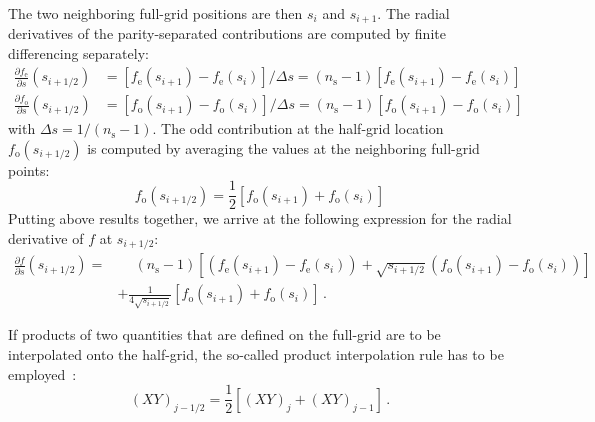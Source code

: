 The two neighboring full-grid positions are then $s_i$ and $s_{i+1}$.
The radial derivatives of the parity-separated contributions are computed by finite differencing separately:
\begin{align}
 \frac{\partial f_\mathrm{e}}{\partial s} \left( s_{i+1/2} \right)
   &= \left[ f_\mathrm{e}(s_{i+1}) - f_\mathrm{e}(s_i) \right] / \Delta s
    = \left( n_\mathrm{s} - 1 \right) \left[ f_\mathrm{e}(s_{i+1}) - f_\mathrm{e}(s_i) \right] \\
 \frac{\partial f_\mathrm{o}}{\partial s} \left( s_{i+1/2} \right)
   &= \left[ f_\mathrm{o}(s_{i+1}) - f_\mathrm{o}(s_i) \right] / \Delta s
    = \left( n_\mathrm{s} - 1 \right) \left[ f_\mathrm{o}(s_{i+1}) - f_\mathrm{o}(s_i) \right]
\end{align}
with $\Delta s = 1 / \left( n_\mathrm{s} - 1 \right)$.
The odd contribution at the half-grid location $f_\mathrm{o}\left( s_{i+1/2} \right)$ is computed
by averaging the values at the neighboring full-grid points:
\begin{equation}
 f_\mathrm{o}\left( s_{i+1/2} \right) = \frac{1}{2} \left[ f_\mathrm{o}(s_{i+1}) + f_\mathrm{o}(s_i) \right]
\end{equation}
Putting above results together, we arrive at the following expression for the radial derivative of $f$ at $s_{i+1/2}$:
\begin{align}
   \frac{\partial f}{\partial s} \left( s_{i+1/2} \right)
 =& \phantom{+}
   \left( n_\mathrm{s} - 1 \right)
   \left[                    \left( f_\mathrm{e}(s_{i+1}) - f_\mathrm{e}(s_i) \right)
          + \sqrt{s_{i+1/2}} \left( f_\mathrm{o}(s_{i+1}) - f_\mathrm{o}(s_i) \right) \right] \nonumber \\
 ~& + \frac{1}{4 \sqrt{s_{i+1/2}}} \left[ f_\mathrm{o}(s_{i+1}) + f_\mathrm{o}(s_i) \right] \, .
\end{align}


If products of two quantities that are defined on the full-grid
are to be interpolated onto the half-grid, the so-called product interpolation rule has to be employed~\cite{hirshman_schwenn_nuehrenberg_1990}:
\begin{equation}
  (X Y)_{j-1/2} = \frac{1}{2} \left[ (X Y)_j + (X Y)_{j-1} \right] \, . \label{eqn:product_interp}
\end{equation}

